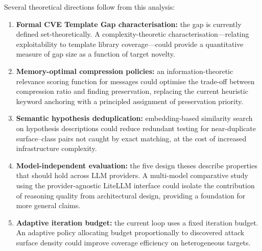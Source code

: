 \documentclass[12pt, a4paper, oneside, openany]{book}
\begin{document}
Several theoretical directions follow from this analysis:

\begin{enumerate}[leftmargin=*]
  \item \textbf{Formal CVE Template Gap characterisation:} the gap
    is currently defined set-theoretically.  A complexity-theoretic
    characterisation---relating exploitability to template library
    coverage---could provide a quantitative measure of gap size as
    a function of target novelty.

  \item \textbf{Memory-optimal compression policies:} an
    information-theoretic relevance scoring function for messages
    could optimise the trade-off between compression ratio and
    finding preservation, replacing the current heuristic keyword
    anchoring with a principled assignment of preservation priority.

  \item \textbf{Semantic hypothesis deduplication:} embedding-based
    similarity search on hypothesis descriptions could reduce
    redundant testing for near-duplicate surface--class pairs not
    caught by exact matching, at the cost of increased infrastructure
    complexity.

  \item \textbf{Model-independent evaluation:} the five design theses
    describe properties that should hold across LLM providers.
    A multi-model comparative study using the provider-agnostic
    LiteLLM interface could isolate the contribution of reasoning
    quality from architectural design, providing a foundation for
    more general claims.

  \item \textbf{Adaptive iteration budget:} the current loop uses a
    fixed iteration budget.  An adaptive policy allocating budget
    proportionally to discovered attack surface density could improve
    coverage efficiency on heterogeneous targets.
\end{enumerate}

\cleardoublepage
\printbibliography[heading=bibintoc, title={References}]

\end{document}
